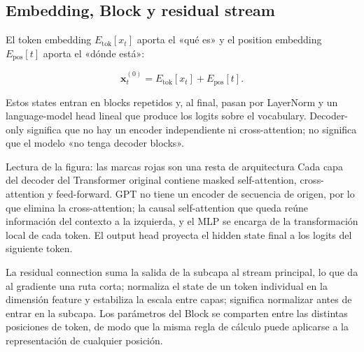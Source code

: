 \subsection{Embedding, Block y residual stream}

El token embedding $E_{\text{tok}}[x_t]$ aporta el «qué es» y el position embedding $E_{\text{pos}}[t]$ aporta el «dónde está»:

\[
\mathbf x_t^{(0)}=E_{\text{tok}}[x_t]+E_{\text{pos}}[t].
\]

Estos states entran en blocks repetidos y, al final, pasan por LayerNorm y un language-model head lineal que produce los logits sobre el vocabulary. Decoder-only significa que no hay un encoder independiente ni cross-attention; no significa que el modelo «no tenga decoder blocks».


\begin{knowledgebox}{Lectura de la figura: las marcas rojas son una resta de arquitectura}
Cada capa del decoder del Transformer original contiene masked self-attention, cross-attention y feed-forward. GPT no tiene un encoder de secuencia de origen, por lo que elimina la cross-attention; la causal self-attention que queda reúne información del contexto a la izquierda, y el MLP se encarga de la transformación local de cada token. El output head proyecta el hidden state final a los logits del siguiente token.
\end{knowledgebox}


La residual connection suma la salida de la subcapa al stream principal, lo que da al gradiente una ruta corta;  normaliza el state de un token individual en la dimensión feature y estabiliza la escala entre capas;  significa normalizar antes de entrar en la subcapa. Los parámetros del Block se comparten entre las distintas posiciones de token, de modo que la misma regla de cálculo puede aplicarse a la representación de cualquier posición.



